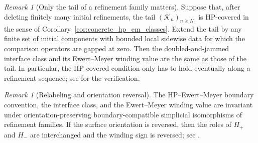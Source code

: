 \documentclass[11pt]{article}
\numberwithin{equation}{section}
\theoremstyle{definition}
\theoremstyle{remark}
\newtheorem{remark}[theorem]{Remark}
\newcommand{\K}{\mathcal{K}}
\begin{document}
\begin{remark}[Only the tail of a refinement family matters]\label{cor:tail_admissibility}
Suppose that, after deleting finitely many initial refinements, the tail \((\K_n)_{n\ge N_0}\) is
HP-covered in the sense of Corollary~\ref{cor:concrete_hp_em_classes}. Extend the tail by any
finite set of initial components with bounded
local sidewise data for which the comparison operators are gapped at zero. Then the
doubled-and-jammed interface class and its Ewert--Meyer winding value are the same as those of the
tail. In particular, the HP-covered condition only has to hold eventually along a refinement
sequence; see  for the verification.
\end{remark}





\begin{remark}[Relabeling and orientation reversal]\label{cor:relabel_orientation}
The HP--Ewert--Meyer boundary convention, the interface class, and the Ewert--Meyer winding value
are invariant under orientation-preserving boundary-compatible simplicial isomorphisms of
refinement families. If the surface orientation is reversed, then the roles of \(H_+\) and \(H_-\)
are interchanged and the winding sign is reversed; see
.
\end{remark}
\end{document}
